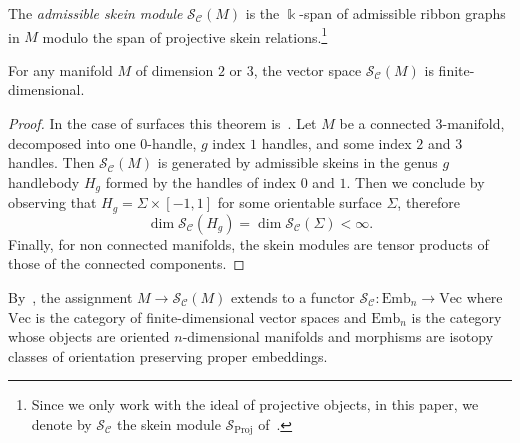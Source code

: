 \documentclass[pdftex]{sigma}
\numberwithin{equation}{section}
\newcommand{\Proj}{\operatorname{Proj}}
\numberwithin{theorem}{section}
\numberwithin{proposition}{section}
\numberwithin{definition}{section}
\numberwithin{lemma}{section}
\numberwithin{corollary}{section}
\numberwithin{remark}{section}
\numberwithin{example}{section}
\newcommand{\cat}{\mathcal{C}}
\newcommand{\FK}{{\Bbbk}}
\newcommand{\TSkein}{{\mathscr{S}}}
\newcommand{\Emb}{\mathrm{Emb}}
\newcommand{\Vect}{\mathrm{Vec}}
\begin{document}
\begin{definition}%
 The \emph{admissible skein module} $\TSkein_{\cat}(M)$ is
 the $\FK$-span of admissible ribbon graphs in $M$ modulo
 the span of projective skein relations.\footnote{Since we only work with the ideal of projective objects, in this paper, we denote by $\TSkein_\cat$ the skein module $\mathcal{S}_{\Proj}$ of~\cite{CGP22}.}
\end{definition}

\begin{theorem}
For any manifold $M$ of dimension $2$ or $3$, the vector space $\TSkein_\cat(M)$ is finite-dimensional.
\end{theorem}
\begin{proof}
In the case of surfaces this theorem is~\cite[Theorem~5.10]{CGP22}. Let $M$ be a connected 3-manifold, decomposed into one $0$-handle, $g$ index $1$ handles, and some index $2$ and $3$ handles.
Then $\TSkein_\cat(M)$ is generated by admissible skeins in the genus $g$ handlebody $H_g$ formed by the handles of index $0$ and $1$. Then we conclude by observing that $H_g=\Sigma\times [-1,1]$ for some orientable surface $\Sigma$, therefore
\[
\dim\TSkein_\cat(H_g)=\dim\TSkein_\cat(\Sigma)<\infty.
\]
Finally, for non connected manifolds, the skein modules are tensor products of those of the connected components.
\end{proof}

By~\cite[Proposition 2.2]{CGP22}, the assignment $M\to \TSkein_{\cat}(M)$ extends to a functor $\TSkein_{\cat}\colon \Emb_n \to \Vect$ where $\Vect$ is the category of finite-dimensional vector spaces and $\Emb_n$ is the category whose objects are oriented $n$-dimensional manifolds and morphisms are isotopy classes of orientation preserving proper embeddings.
\end{document}
